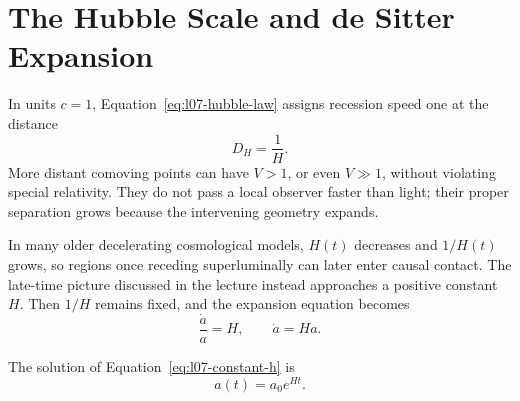 \section{The Hubble Scale and de Sitter Expansion}

In units \(c=1\), Equation~\eqref{eq:l07-hubble-law} assigns recession speed one at the distance
\begin{equation}
D_H=\frac{1}{H}.
\label{eq:l07-hubble-radius}
\end{equation}
More distant comoving points can have \(V>1\), or even \(V\gg1\), without violating special relativity. They do not pass a local observer faster than light; their proper separation grows because the intervening geometry expands.

In many older decelerating cosmological models, \(H(t)\) decreases and \(1/H(t)\) grows, so regions once receding superluminally can later enter causal contact. The late-time picture discussed in the lecture instead approaches a positive constant \(H\). Then \(1/H\) remains fixed, and the expansion equation becomes
\begin{equation}
\frac{\dot a}{a}=H,
\qquad
\dot a=Ha.
\label{eq:l07-constant-h}
\end{equation}

\begin{classroomqa}
\end{classroomqa}

The solution of Equation~\eqref{eq:l07-constant-h} is
\begin{equation}
a(t)=a_0e^{Ht}.
\label{eq:l07-desitter-scale-factor}
\end{equation}

\begin{classroomqa}
\end{classroomqa}

